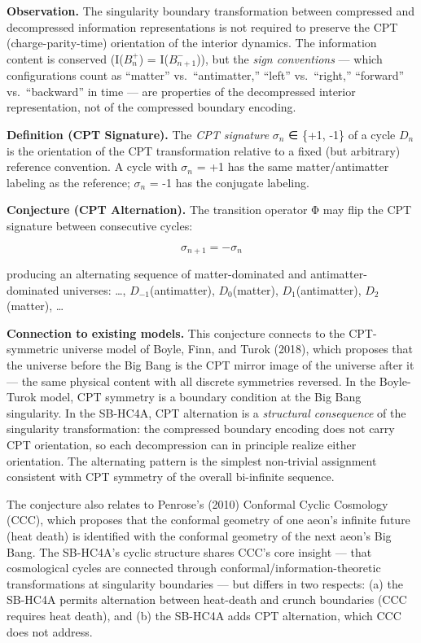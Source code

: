 \documentclass[
]{article}
\begin{document}
\textbf{Observation.} The singularity boundary transformation between
compressed and decompressed information representations is not required
to preserve the CPT (charge-parity-time) orientation of the interior
dynamics. The information content is conserved (I(\(B_n^+\)) =
I(\(B_{n+1}^-\))), but the \emph{sign conventions} --- which
configurations count as ``matter'' vs.~``antimatter,'' ``left''
vs.~``right,'' ``forward'' vs.~``backward'' in time --- are properties
of the decompressed interior representation, not of the compressed
boundary encoding.

\textbf{Definition (CPT Signature).} The \emph{CPT signature}
\(\sigma_{n}\) ∈ \{+1, -1\} of a cycle \(D_{n}\) is the orientation of
the CPT transformation relative to a fixed (but arbitrary) reference
convention. A cycle with \(\sigma_{n}\) = +1 has the same
matter/antimatter labeling as the reference; \(\sigma_{n}\) = -1 has the
conjugate labeling.

\textbf{Conjecture (CPT Alternation).} The transition operator Φ may
flip the CPT signature between consecutive cycles:

\[\sigma_{n+1} = -\sigma_n\]

producing an alternating sequence of matter-dominated and
antimatter-dominated universes: \ldots, \(D_{-1}\)(antimatter),
\(D_{0}\)(matter), \(D_{1}\)(antimatter), \(D_{2}\)(matter), \ldots{}

\textbf{Connection to existing models.} This conjecture connects to the
CPT-symmetric universe model of Boyle, Finn, and Turok (2018), which
proposes that the universe before the Big Bang is the CPT mirror image
of the universe after it --- the same physical content with all discrete
symmetries reversed. In the Boyle-Turok model, CPT symmetry is a
boundary condition at the Big Bang singularity. In the SB-HC4A, CPT
alternation is a \emph{structural consequence} of the singularity
transformation: the compressed boundary encoding does not carry CPT
orientation, so each decompression can in principle realize either
orientation. The alternating pattern is the simplest non-trivial
assignment consistent with CPT symmetry of the overall bi-infinite
sequence.

The conjecture also relates to Penrose's (2010) Conformal Cyclic
Cosmology (CCC), which proposes that the conformal geometry of one
aeon's infinite future (heat death) is identified with the conformal
geometry of the next aeon's Big Bang. The SB-HC4A's cyclic structure
shares CCC's core insight --- that cosmological cycles are connected
through conformal/information-theoretic transformations at singularity
boundaries --- but differs in two respects: (a) the SB-HC4A permits
alternation between heat-death and crunch boundaries (CCC requires heat
death), and (b) the SB-HC4A adds CPT alternation, which CCC does not
address.
\end{document}
